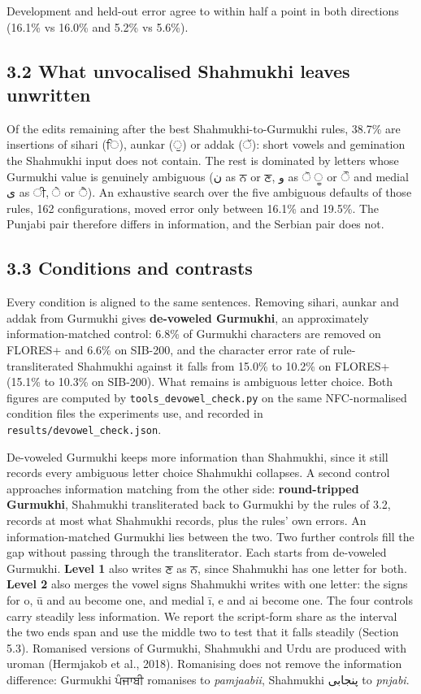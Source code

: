Development and held-out error agree to within half a point in both
directions (16.1\% vs 16.0\% and 5.2\% vs 5.6\%).

\hypertarget{what-unvocalised-shahmukhi-leaves-unwritten}{%
\subsection{3.2 What unvocalised Shahmukhi leaves
unwritten}\label{what-unvocalised-shahmukhi-leaves-unwritten}}

Of the edits remaining after the best Shahmukhi-to-Gurmukhi rules,
38.7\% are insertions of sihari (ਿ), aunkar (ੁ) or addak (ੱ): short vowels
and gemination the Shahmukhi input does not contain. The rest is
dominated by letters whose Gurmukhi value is genuinely ambiguous (ن as ਨ
or ਣ, و as ੋ ੂ or ੌ and medial ی as ੀ, ੇ or ੈ). An exhaustive search
over the five ambiguous defaults of those rules, 162 configurations,
moved error only between 16.1\% and 19.5\%. The Punjabi pair therefore
differs in information, and the Serbian pair does not.

\hypertarget{conditions-and-contrasts}{%
\subsection{3.3 Conditions and
contrasts}\label{conditions-and-contrasts}}

Every condition is aligned to the same sentences. Removing sihari,
aunkar and addak from Gurmukhi gives \textbf{de-voweled Gurmukhi}, an
approximately information-matched control: 6.8\% of Gurmukhi characters
are removed on FLORES+ and 6.6\% on SIB-200, and the character error
rate of rule-transliterated Shahmukhi against it falls from 15.0\% to
10.2\% on FLORES+ (15.1\% to 10.3\% on SIB-200). What remains is
ambiguous letter choice. Both figures are computed by
\texttt{tools\_devowel\_check.py} on the same NFC-normalised condition
files the experiments use, and recorded in
\texttt{results/devowel\_check.json}.

De-voweled Gurmukhi keeps more information than Shahmukhi, since it
still records every ambiguous letter choice Shahmukhi collapses. A
second control approaches information matching from the other side:
\textbf{round-tripped Gurmukhi}, Shahmukhi transliterated back to
Gurmukhi by the rules of 3.2, records at most what Shahmukhi records,
plus the rules' own errors. An information-matched Gurmukhi lies between
the two. Two further controls fill the gap without passing through the
transliterator. Each starts from de-voweled Gurmukhi. \textbf{Level 1}
also writes ਣ as ਨ, since Shahmukhi has one letter for both.
\textbf{Level 2} also merges the vowel signs Shahmukhi writes with one
letter: the signs for o, ū and au become one, and medial ī, e and ai
become one. The four controls carry steadily less information. We report
the script-form share as the interval the two ends span and use the
middle two to test that it falls steadily (Section 5.3). Romanised
versions of Gurmukhi, Shahmukhi and Urdu are produced with uroman
(Hermjakob et al., 2018). Romanising does not remove the information
difference: Gurmukhi ਪੰਜਾਬੀ romanises to \emph{pamjaabii}, Shahmukhi
پنجابی to \emph{pnjabi}.

